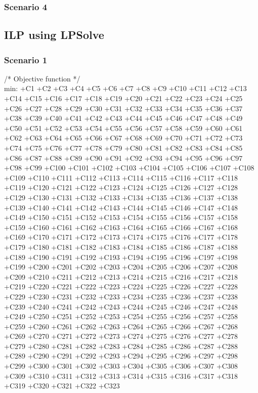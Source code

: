 \subsubsection{Scenario 4}


\subsection{ILP using LPSolve}

\subsubsection{Scenario 1}

/* Objective function */ \\
min: +C1 +C2 +C3 +C4 +C5 +C6 +C7 +C8 +C9 +C10 +C11 +C12 +C13 +C14 +C15 +C16 +C17 +C18 +C19 +C20 +C21 +C22
 +C23 +C24 +C25 +C26 +C27 +C28 +C29 +C30 +C31 +C32 +C33 +C34 +C35 +C36 +C37 +C38 +C39 +C40 +C41 +C42
 +C43 +C44 +C45 +C46 +C47 +C48 +C49 +C50 +C51 +C52 +C53 +C54 +C55 +C56 +C57 +C58 +C59 +C60 +C61 +C62
 +C63 +C64 +C65 +C66 +C67 +C68 +C69 +C70 +C71 +C72 +C73 +C74 +C75 +C76 +C77 +C78 +C79 +C80 +C81 +C82
 +C83 +C84 +C85 +C86 +C87 +C88 +C89 +C90 +C91 +C92 +C93 +C94 +C95 +C96 +C97 +C98 +C99 +C100 +C101 +C102
 +C103 +C104 +C105 +C106 +C107 +C108 +C109 +C110 +C111 +C112 +C113 +C114 +C115 +C116 +C117 +C118 +C119
 +C120 +C121 +C122 +C123 +C124 +C125 +C126 +C127 +C128 +C129 +C130 +C131 +C132 +C133 +C134 +C135 +C136
 +C137 +C138 +C139 +C140 +C141 +C142 +C143 +C144 +C145 +C146 +C147 +C148 +C149 +C150 +C151 +C152 +C153
 +C154 +C155 +C156 +C157 +C158 +C159 +C160 +C161 +C162 +C163 +C164 +C165 +C166 +C167 +C168 +C169 +C170
 +C171 +C172 +C173 +C174 +C175 +C176 +C177 +C178 +C179 +C180 +C181 +C182 +C183 +C184 +C185 +C186 +C187
 +C188 +C189 +C190 +C191 +C192 +C193 +C194 +C195 +C196 +C197 +C198 +C199 +C200 +C201 +C202 +C203 +C204
 +C205 +C206 +C207 +C208 +C209 +C210 +C211 +C212 +C213 +C214 +C215 +C216 +C217 +C218 +C219 +C220 +C221
 +C222 +C223 +C224 +C225 +C226 +C227 +C228 +C229 +C230 +C231 +C232 +C233 +C234 +C235 +C236 +C237 +C238
 +C239 +C240 +C241 +C242 +C243 +C244 +C245 +C246 +C247 +C248 +C249 +C250 +C251 +C252 +C253 +C254 +C255
 +C256 +C257 +C258 +C259 +C260 +C261 +C262 +C263 +C264 +C265 +C266 +C267 +C268 +C269 +C270 +C271 +C272
 +C273 +C274 +C275 +C276 +C277 +C278 +C279 +C280 +C281 +C282 +C283 +C284 +C285 +C286 +C287 +C288 +C289
 +C290 +C291 +C292 +C293 +C294 +C295 +C296 +C297 +C298 +C299 +C300 +C301 +C302 +C303 +C304 +C305 +C306
 +C307 +C308 +C309 +C310 +C311 +C312 +C313 +C314 +C315 +C316 +C317 +C318 +C319 +C320 +C321 +C322 +C323
